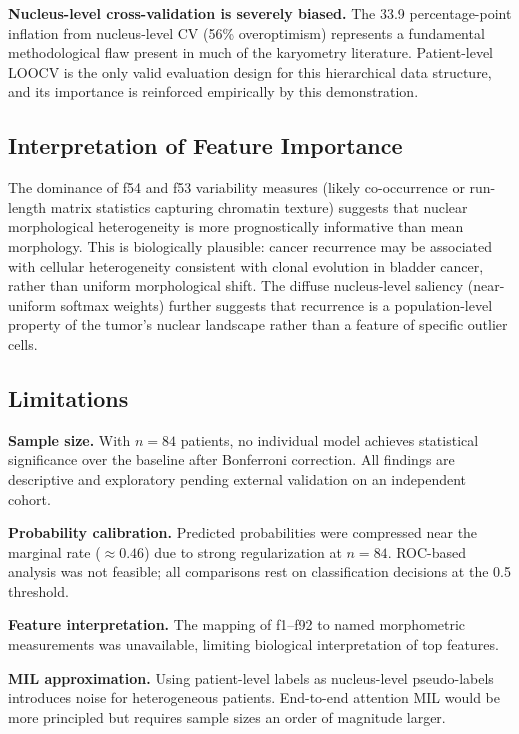 \documentclass[12pt, onecolumn]{article}
\begin{document}
\textbf{Nucleus-level cross-validation is severely biased.}
The 33.9 percentage-point inflation from nucleus-level CV (56\%
overoptimism) represents a fundamental methodological flaw
present in much of the karyometry literature. Patient-level LOOCV
is the only valid evaluation design for this hierarchical
data structure, and its importance is reinforced empirically by
this demonstration.

\subsection{Interpretation of Feature Importance}

The dominance of f54 and f53 variability measures (likely
co-occurrence or run-length matrix statistics capturing chromatin
texture) suggests that nuclear morphological heterogeneity is
more prognostically informative than mean morphology. This is
biologically plausible: cancer recurrence may be associated with
cellular heterogeneity consistent with clonal evolution in bladder
cancer, rather than uniform morphological shift. The diffuse
nucleus-level saliency (near-uniform softmax weights) further
suggests that recurrence is a population-level property of the
tumor's nuclear landscape rather than a feature of specific
outlier cells.

\subsection{Limitations}

\textbf{Sample size.} With $n = 84$ patients, no individual model
achieves statistical significance over the baseline after
Bonferroni correction. All findings are descriptive and
exploratory pending external validation on an independent cohort.

\textbf{Probability calibration.} Predicted probabilities were
compressed near the marginal rate ($\approx 0.46$) due to strong
regularization at $n = 84$. ROC-based analysis was not feasible;
all comparisons rest on classification decisions at the 0.5
threshold.

\textbf{Feature interpretation.} The mapping of f1--f92 to named
morphometric measurements was unavailable, limiting biological
interpretation of top features.

\textbf{MIL approximation.} Using patient-level labels as
nucleus-level pseudo-labels introduces noise for heterogeneous
patients. End-to-end attention MIL \citep{ilse2018} would be more
principled but requires sample sizes an order of magnitude larger.
\end{document}
